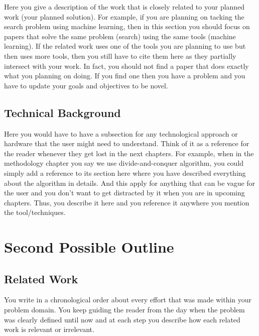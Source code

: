 Here you give a description of the work that is closely related to your planned work (your planned solution). For example, if you are planning on tacking the search problem using machine learning, then in this section you should focus on papers that solve the same problem (search) using the same tools (machine learning). If the related work uses one of the tools you are planning to use but then uses more tools, then you still have to cite them here as they partially intersect with your work. In fact, you should not find a paper that does exactly what you planning on doing. If you find one then you have a problem and you have to update your goals and objectives to be novel. 


\subsection{Technical Background}
\label{sub:technical_background}

Here you would have to have a subsection for any technological approach or hardware that the user might need to understand. Think of it as a reference for the reader whenever they get lost in the next chapters. For example, when in the methodology chapter you say we use divide-and-conquer algorithm, you could simply add a reference to its section here where you have described everything about the algorithm in details. And this apply for anything that can be vague for the user and you don't want to get distracted by it when you are in upcoming chapters. Thus, you describe it here and you reference it anywhere you mention the tool/techniques.

\section{Second Possible Outline}
\label{sec:second_possible_outline}

\subsection{Related Work}
\label{sub:related_work2}

You write in a chronological order about every effort that was made within your problem domain. You keep guiding the reader from the day when the problem was clearly defined until now and at each step you describe how each related work is relevant or irrelevant.

